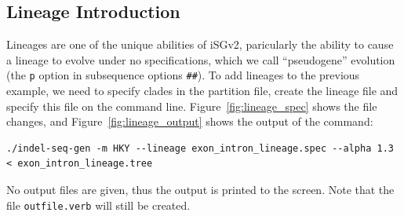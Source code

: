 \documentclass[10pt]{article}
\begin{document}
 \subsection{Lineage Introduction}
 Lineages are one of the unique abilities of iSGv2, paricularly the ability to cause a lineage to evolve under no specifications, which we call ``pseudogene'' evolution (the {\tt p} option in subsequence options {\tt \#\#}). To add lineages to the previous example, we need to specify clades in the partition file, create the lineage file and specify this file on the command line. Figure~\ref{fig:lineage_spec} shows the file changes, and Figure~\ref{fig:lineage_output} shows the output of the command:

 \begin{verbatim}
./indel-seq-gen -m HKY --lineage exon_intron_lineage.spec --alpha 1.3 < exon_intron_lineage.tree
 \end{verbatim}

 No output files are given, thus the output is printed to the screen. Note that the file {\tt outfile.verb} will still be created.
\end{document}
